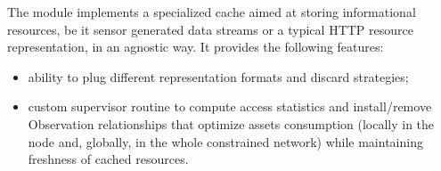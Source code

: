 The \href{https://github.com/koanlogic/webthings/tree/master/bits/kache}{} module implements a specialized cache aimed at storing informational resources, be it sensor generated data streams or a typical HTTP resource representation, in an agnostic way.  It provides the following features: 
\begin{itemize}
\item ability to plug different representation formats and discard strategies;
\item custom supervisor routine to compute access statistics and install/remove Observation relationships that optimize assets consumption (locally in the node and, globally, in the whole constrained network) while maintaining freshness of cached resources.
\end{itemize}

